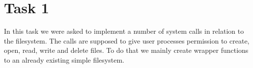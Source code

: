 \documentclass[11pt]{article}
\begin{document}

\clearpage
\maketitle
\thispagestyle{empty}

\newpage

\tableofcontents

\newpage


\section{Task 1}
In this task we were asked to implement a number of system calls in relation to
the filesystem.  The calls are supposed to give user processes permission to
create, open, read, write and delete files.  To do that we mainly create wrapper
functions to an already existing simple filesystem. \\
\end{document}
